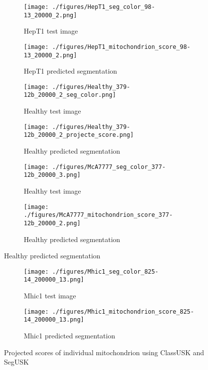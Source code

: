 \begin{figure}[htb!]
\ContinuedFloat

\begin{subfigure}{.5\textwidth}
         \centering
        \texttt{[image: ./figures/HepT1\_seg\_color\_98-13\_20000\_2.png]}
        \caption{HepT1 test image}
      
    \end{subfigure}
  \begin{subfigure}{.5\textwidth}
        \centering
       \texttt{[image: ./figures/HepT1\_mitochondrion\_score\_98-13\_20000\_2.png]}
        \caption{HepT1 predicted segmentation}
 \end{subfigure}

     \begin{subfigure}{.5\textwidth}
        \centering
        \texttt{[image: ./figures/Healthy\_379-12b\_20000\_2\_seg\_color.png]}
        \caption{Healthy test image}
        \label{fig:healthy_label}
    \end{subfigure}
    \begin{subfigure}{.5\textwidth}
        \centering
        \texttt{[image: ./figures/Healthy\_379-12b\_20000\_2\_projecte\_score.png]}
        \caption{Healthy predicted segmentation}
        \label{fig:healthy_label}
    \end{subfigure}
    
         \begin{subfigure}{.5\textwidth}
        \centering
        \texttt{[image: ./figures/McA7777\_seg\_color\_377-12b\_20000\_3.png]}
        \caption{Healthy test image}
        \label{fig:healthy_label}
    \end{subfigure}
    \begin{subfigure}{.5\textwidth}
        \centering
        \texttt{[image: ./figures/McA7777\_mitochondrion\_score\_377-12b\_20000\_2.png]}
        \caption{Healthy predicted segmentation}
        \label{fig:healthy_label}
    \end{subfigure}
\end{figure}

\begin{figure}[htb!]
\ContinuedFloat

\begin{subfigure}{.5\textwidth}
        \centering
        \texttt{[image: ./figures/Mhic1\_seg\_color\_825-14\_200000\_13.png]}
        \caption{Mhic1 test image}
        \label{fig:healthy_label}
    \end{subfigure}
    \begin{subfigure}{.5\textwidth}
        \centering
        \texttt{[image: ./figures/Mhic1\_mitochondrion\_score\_825-14\_200000\_13.png]}
        \caption{Mhic1 predicted segmentation}
        \label{fig:healthy_label}
    \end{subfigure}    

  \caption{Projected scores of individual mitochondrion using ClassUSK and SegUSK}
    \label{fig:mitochondrion_score} 
\end{figure}


